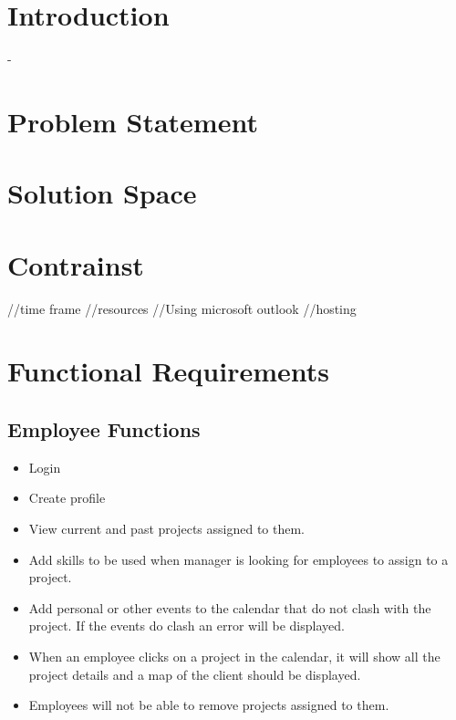 \documentclass{article}
\begin{document}
\section{Introduction}
  \begin{paragraph}
  
  \end{paragraph}
 
-  \section{Problem Statement}
  \begin{paragraph}
  
  \end{paragraph}
  
  \section{Solution Space}
  \begin{paragraph}
  
  \end{paragraph}
  
   \section{Contrainst}
  \begin{paragraph}
  //time frame
  //resources
  //Using microsoft outlook
  //hosting
  \end{paragraph}
  
  \section{Functional Requirements}
	\subsection{Employee Functions}
		\begin{itemize}
			\item Login
			\item Create profile
			\item View current and past projects assigned to them. 
			\item Add skills to be used when manager is looking for employees to assign to a project.
			\item Add personal or other events to the calendar that do not clash with the project. If the events do clash an error will be displayed.  
			\item When an employee clicks on a project in the calendar, it will show all the project details and a map of the client should be displayed.
			\item Employees will not be able to remove projects assigned to them.
		\end{itemize}
\end{document}
